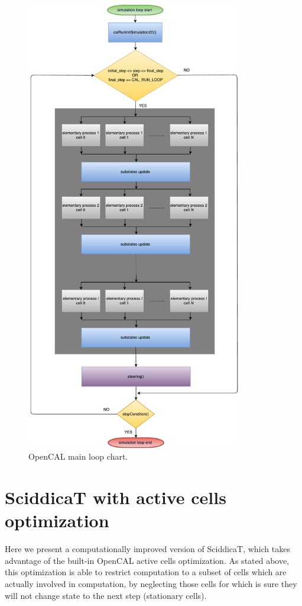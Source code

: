 \begin{figure}[htbp]
  \centering
  \includegraphics[width=9.5cm]{./images/OpenCAL/opencal_main_loop}
  \caption{OpenCAL main loop chart.}
  \label{fig:opencal_main_loop}
\end{figure}


\section{SciddicaT with active cells optimization}\label{sec:sciddicaT_active}
Here we present a computationally improved version of SciddicaT, which
takes advantage of the built-in OpenCAL active cells optimization. As
stated above, this optimization is able to restrict computation to a
subset of cells which are actually involved in computation, by
neglecting those cells for which is sure they will not change state to
the next step (stationary cells).

